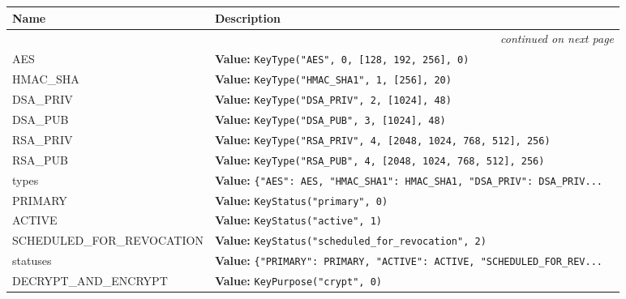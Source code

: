     \vspace{-1cm}
\hspace{\varindent}\begin{longtable}{|p{\varnamewidth}|p{\vardescrwidth}|l}
\cline{1-2}
\cline{1-2} \centering \textbf{Name} & \centering \textbf{Description}& \\
\cline{1-2}
\endhead\cline{1-2}\multicolumn{3}{r}{\small\textit{continued on next page}}\\\endfoot\cline{1-2}
\endlastfoot\raggedright A\-E\-S\- & \raggedright \textbf{Value:} 
{\tt KeyType("AES", 0, [128, 192, 256], 0)}&\\
\cline{1-2}
\raggedright H\-M\-A\-C\-\_\-S\-H\-A\-1\- & \raggedright \textbf{Value:} 
{\tt KeyType("HMAC\_SHA1", 1, [256], 20)}&\\
\cline{1-2}
\raggedright D\-S\-A\-\_\-P\-R\-I\-V\- & \raggedright \textbf{Value:} 
{\tt KeyType("DSA\_PRIV", 2, [1024], 48)}&\\
\cline{1-2}
\raggedright D\-S\-A\-\_\-P\-U\-B\- & \raggedright \textbf{Value:} 
{\tt KeyType("DSA\_PUB", 3, [1024], 48)}&\\
\cline{1-2}
\raggedright R\-S\-A\-\_\-P\-R\-I\-V\- & \raggedright \textbf{Value:} 
{\tt KeyType("RSA\_PRIV", 4, [2048, 1024, 768, 512], 256)}&\\
\cline{1-2}
\raggedright R\-S\-A\-\_\-P\-U\-B\- & \raggedright \textbf{Value:} 
{\tt KeyType("RSA\_PUB", 4, [2048, 1024, 768, 512], 256)}&\\
\cline{1-2}
\raggedright t\-y\-p\-e\-s\- & \raggedright \textbf{Value:} 
{\tt \{"AES": AES, "HMAC\_SHA1": HMAC\_SHA1, "DSA\_PRIV": DSA\_PRIV\texttt{...}}&\\
\cline{1-2}
\raggedright P\-R\-I\-M\-A\-R\-Y\- & \raggedright \textbf{Value:} 
{\tt KeyStatus("primary", 0)}&\\
\cline{1-2}
\raggedright A\-C\-T\-I\-V\-E\- & \raggedright \textbf{Value:} 
{\tt KeyStatus("active", 1)}&\\
\cline{1-2}
\raggedright S\-C\-H\-E\-D\-U\-L\-E\-D\-\_\-F\-O\-R\-\_\-R\-E\-V\-O\-C\-A\-T\-I\-O\-N\- & \raggedright \textbf{Value:} 
{\tt KeyStatus("scheduled\_for\_revocation", 2)}&\\
\cline{1-2}
\raggedright s\-t\-a\-t\-u\-s\-e\-s\- & \raggedright \textbf{Value:} 
{\tt \{"PRIMARY": PRIMARY, "ACTIVE": ACTIVE, "SCHEDULED\_FOR\_REV\texttt{...}}&\\
\cline{1-2}
\raggedright D\-E\-C\-R\-Y\-P\-T\-\_\-A\-N\-D\-\_\-E\-N\-C\-R\-Y\-P\-T\- & \raggedright \textbf{Value:} 
{\tt KeyPurpose("crypt", 0)}&\\

\end{longtable}
